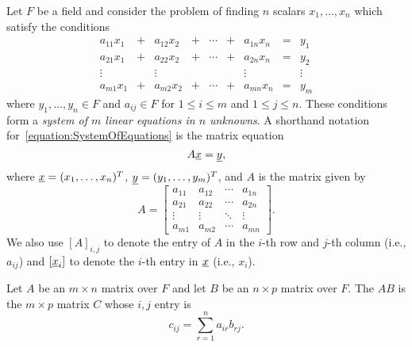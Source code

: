 Let $F$ be a field and consider the problem of finding $n$ scalars $x_1, \ldots, x_n$ which satisfy the conditions
\begin{equation} \label{equation:SystemOfEquations}
\begin{array}{ccccccccc}
a_{11} x_1 & + & a_{12} x_2 & + & \cdots & + & a_{1n} x_n & = & y_1 \\
a_{21} x_1 & + & a_{22} x_2 & + & \cdots & + & a_{2n} x_n & = & y_2 \\
\vdots & & \vdots  & & & & \vdots & & \vdots \\
a_{m1} x_1 & + & a_{m2} x_2 & + & \cdots & + & a_{mn} x_n & = & y_m
\end{array}
\end{equation}
where $y_1,\ldots,y_n \in F$ and $a_{ij} \in F$ for $1 \leq i \leq m$ and $1 \leq j \leq n$.
These conditions form a \emph{system of $m$ linear equations in $n$ unknowns}.
A shorthand notation for~\eqref{equation:SystemOfEquations} is the matrix equation
\begin{equation*}
A \underline{x} = \underline{y},
\end{equation*}
where
$\underline{x} = (x_1, \ldots, x_n)^T$, 
$\underline{y} = (y_1, \ldots, y_m)^T$, and
$A$ is the matrix given by
\begin{equation*}
A = \begin{bmatrix}
a_{11} & a_{12} & \cdots & a_{1n} \\
a_{21} & a_{22} & \cdots & a_{2n} \\
\vdots & \vdots & \ddots & \vdots \\
a_{m1} & a_{m2} & \cdots & a_{mn}
\end{bmatrix}.
\end{equation*}
We also use $[A]_{i,j}$ to denote the entry of $A$ in the $i$-th row and $j$-th column (i.e., $a_{ij}$) and $[\underline{x}_i ]$ to denote the $i$-th entry in $\underline{x}$ (i.e., $x_i$).

\begin{definition}
Let $A$ be an $m \times n$ matrix over $F$ and let $B$ be an $n \times p$ matrix over $F$.
The  $AB$ is the $m \times p$ matrix $C$ whose $i,j$ entry is
\begin{equation} \label{eq:def_matrix_product}
c_{ij} = \sum_{r = 1}^n a_{ir} b_{rj}.
\end{equation}
\end{definition}

